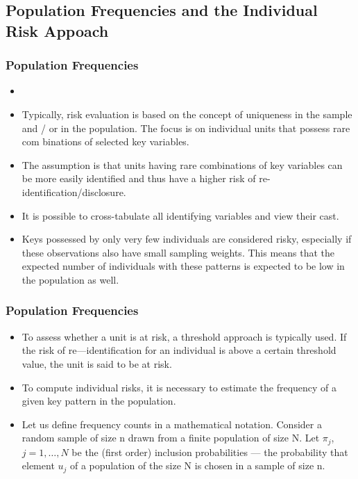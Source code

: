 \documentclass{beamer}
\begin{document}
\subsection*{Population Frequencies and the Individual Risk Appoach}
\begin{frame}	
	\frametitle{Population Frequencies}
	\begin{itemize}
		\item 
	\item Typically, risk evaluation is based on the concept of uniqueness in the sample
	and / or in the population. The focus is on individual units that possess rare com	binations of selected key variables.
	\item The assumption is that units having rare
	combinations of key variables can be more easily identiﬁed and thus have a higher
	risk of re-identiﬁcation/disclosure. 
	\item It is possible to cross-tabulate all identifying
	variables and view their cast. 
	\item Keys possessed by only very few individuals are
	considered risky, especially if these observations also have small sampling weights.
	This means that the expected number of individuals with these patterns is expected to be low in the population as well.
\end{itemize}
\end{frame}
\begin{frame}	
	\frametitle{Population Frequencies}

\begin{itemize}
	\item To assess whether a unit is at risk, a threshold approach is typically used. If the
	risk of re—identiﬁcation for an individual is above a certain threshold value, the unit
	is said to be at risk. 
	\item To compute individual risks, it is necessary to estimate the
	frequency of a given key pattern in the population. 
	
	\item Let us deﬁne frequency counts
	in a mathematical notation. Consider a random sample of size n drawn from a
	ﬁnite population of size N. Let $\pi_j$, $j = 1, \ldots ,N$ be the (ﬁrst order) inclusion
	probabilities — the probability that element $u_j$ of a population of the size N is
	chosen in a sample of size n.
\end{itemize}
\end{frame}
\end{document}
